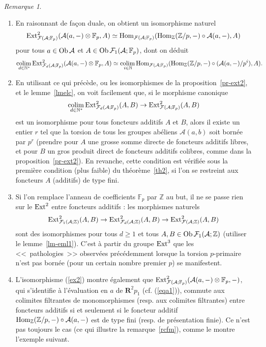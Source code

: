 \documentclass[a4paper,10pt]{article}
\newcommand{\A}{{\mathcal{A}}}
\newcommand{\F}{{\mathcal{F}}}
\newcommand{\col}{{\rm colim}\,}
\theoremstyle{definition}
\theoremstyle{remark}
\newtheorem{rem}[thm]{Remarque}
\begin{document}
\begin{rem}\label{rqf}
\begin{enumerate}
 \item En raisonnant de façon duale, on obtient un isomorphisme naturel
\begin{equation}\label{ex2}
 {\rm Ext}^2_{\F(\A;\mathbb{F}_p)}(\A(a,-)\otimes\mathbb{F}_p,A)\simeq {\rm Hom}_{\F(\A;\mathbb{F}_p)}({\rm Hom}_\mathbb{Z}(\mathbb{Z}/p,-)\circ\A(a,-),A)
\end{equation}
pour tous $a\in {\rm Ob}\,\A$ et $A\in {\rm Ob}\,\F_1(\A;\mathbb{F}_p)$, dont on déduit
$$\underset{d\in\mathbb{N}^*}{\col}{\rm Ext}^2_{\F_d(\A;\mathbb{F}_p)}(\A(a,-)\otimes\mathbb{F}_p,A)\simeq\underset{i\in\mathbb{N}}{\col}{\rm Hom}_{\F(\A;\mathbb{F}_p)}({\rm Hom}_\mathbb{Z}(\mathbb{Z}/p,-)\circ (\A(a,-)/p^i),A).$$
\item En utilisant ce qui précède, ou les isomorphismes de la proposition~\ref{pr-ext2}, et le lemme~\ref{lmelc}, on voit facilement que, si le morphisme canonique
$$\underset{d\in\mathbb{N}^*}{\col}{\rm Ext}^2_{\F_d(\A;\mathbb{F}_p)}(A,B)\to{\rm Ext}^2_{\F(\A;\mathbb{F}_p)}(A,B)$$
est un isomorphisme pour tous foncteurs additifs $A$ et $B$, alors il existe un entier $r$ tel que la torsion de tous les groupes abéliens $\A(a,b)$ soit bornée par $p^r$ (prendre pour $A$ une grosse somme directe de foncteurs additifs libres, et pour $B$ un gros produit direct de foncteurs additifs colibres, comme dans la proposition~\ref{pr-ext2}). En revanche, cette condition est vérifiée sous la première condition (plus faible) du théorème~\ref{th2}, si l'on se restreint aux foncteurs $A$ (additifs) de type fini.
\item Si l'on remplace l'anneau de coefficients $\mathbb{F}_p$ par $\mathbb{Z}$ au but, il ne se passe rien sur le ${\rm Ext}^2$ entre foncteurs additifs : les morphismes naturels
$${\rm Ext}^2_{\F_1(\A;\mathbb{Z})}(A,B)\to {\rm Ext}^2_{\F_d(\A;\mathbb{Z})}(A,B)\to {\rm Ext}^2_{\F(\A;\mathbb{Z})}(A,B)$$
sont des isomorphismes pour tous $d\geq 1$ et tous $A, B\in {\rm Ob}\,\F_1(\A;\mathbb{Z})$ (utiliser le lemme~\ref{lm-eml1}). C'est à partir du groupe ${\rm Ext}^3$ que les <<~pathologies~>> observées précédemment lorsque la torsion $p$-primaire n'est pas bornée (pour un certain nombre premier $p$) se manifestent.
\item\label{rfff} L'isomorphisme (\ref{ex2}) montre également que ${\rm Ext}^2_{\F(\A;\mathbb{F}_p)}(\A(a,-)\otimes\mathbb{F}_p,-)$, qui s'identifie à l'évaluation en $a$ de $\mathbf{R}^2 p_1$ (cf. (\ref{eqa1})), commute aux colimites filtrantes de monomorphismes (resp. aux colimites filtrantes) entre foncteurs additifs si et seulement si le foncteur additif ${\rm Hom}_\mathbb{Z}(\mathbb{Z}/p,-)\circ\A(a,-)$ est de type fini (resp. de présentation finie). Ce n'est pas toujours le cas (ce qui illustre la remarque~\ref{rcfm}), comme le montre l'exemple suivant.


\end{enumerate}
\end{rem}
\end{document}
